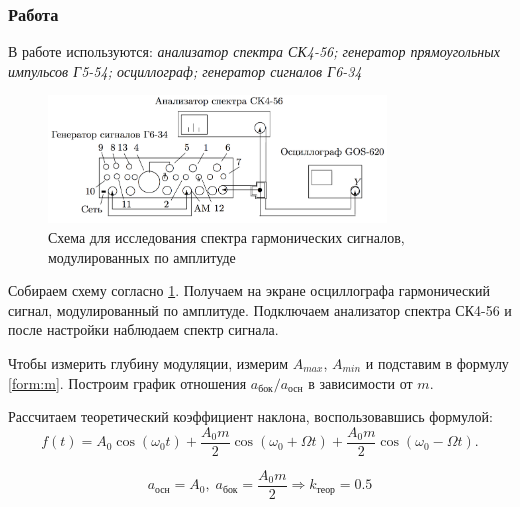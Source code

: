 \documentclass[a4paper, 12pt]{article}
\begin{document}
\subsubsection*{Работа}
В работе используются: \textit{анализатор спектра СК4-56; генератор прямоугольных импульсов Г5-54; осциллограф; генератор сигналов Г6-34}

\begin{figure}[H]
\centering
\includegraphics[width = 0.8\textwidth]{SchemeC}
\caption{Схема для исследования спектра гармонических сигналов, модулированных по амплитуде}
\label{img:scheme C}
\end{figure}

Собираем схему согласно \ref{img:scheme C}. Получаем на экране осциллографа гармонический сигнал, модулированный по амплитуде. Подключаем анализатор спектра СК4-56 и после настройки наблюдаем спектр сигнала.

Чтобы измерить глубину модуляции, измерим $A_{max}$, $A_{min}$ и подставим в формулу \ref{form:m}. Построим график отношения $a_\text{бок}/a_\text{осн}$ в зависимости от $m$.

Рассчитаем теоретический коэффициент наклона, воспользовавшись формулой:
\begin{equation}
\label{form:a/a(m)}
	f(t)=A_0\cos(\omega_0t)+	\frac{A_0m}{2}\cos(\omega_0+\Omega t)+\frac{A_0m}{2}\cos(\omega_0-\Omega t). 
\end{equation}

$$a_\text{осн} = A_0, \; a_\text{бок}= \frac{A_0m}{2} \Rightarrow k_\text{теор} = 0.5$$
	
\end{document}
